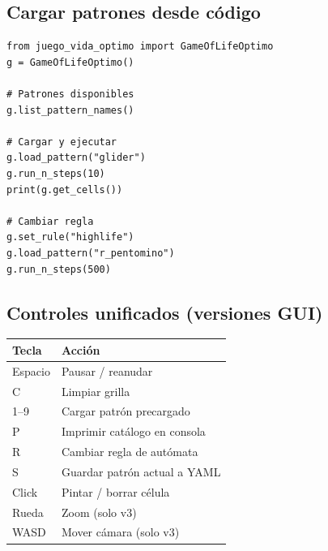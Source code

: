 \documentclass[12pt,a4paper]{article}
\begin{document}
\subsection{Cargar patrones desde código}

\begin{verbatim}
from juego_vida_optimo import GameOfLifeOptimo
g = GameOfLifeOptimo()

# Patrones disponibles
g.list_pattern_names()

# Cargar y ejecutar
g.load_pattern("glider")
g.run_n_steps(10)
print(g.get_cells())

# Cambiar regla
g.set_rule("highlife")
g.load_pattern("r_pentomino")
g.run_n_steps(500)
\end{verbatim}

\subsection{Controles unificados (versiones GUI)}

\begin{table}[h]
\centering
\begin{tabular}{ll}
\toprule
\textbf{Tecla} & \textbf{Acción} \\
\midrule
Espacio   & Pausar / reanudar \\
C         & Limpiar grilla \\
1--9      & Cargar patrón precargado \\
P         & Imprimir catálogo en consola \\
R         & Cambiar regla de autómata \\
S         & Guardar patrón actual a YAML \\
Click     & Pintar / borrar célula \\
Rueda     & Zoom (solo v3) \\
WASD      & Mover cámara (solo v3) \\
\bottomrule
\end{tabular}
\end{table}
\end{document}
